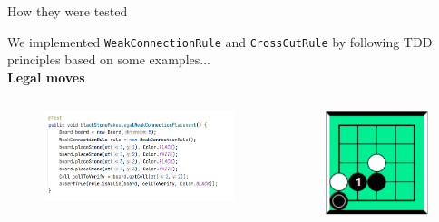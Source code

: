 \documentclass{beamer}
\begin{document}
\begin{frame}[t]{How they were tested }
	
	We implemented \texttt{WeakConnectionRule} and \texttt{CrossCutRule} by following TDD principles based on some examples...\\
	\vspace{0.1cm}
	\textbf{Legal moves}
	\begin{columns}
		\begin{figure}[t]
			\includegraphics[scale=0.2]{images/test-legal-weak.png}
		\end{figure}
		\begin{figure}[t]
			\includegraphics[scale=0.15]{images/legal-move.png}
		\end{figure}
		
	\end{columns}
	

\end{frame}
\end{document}
